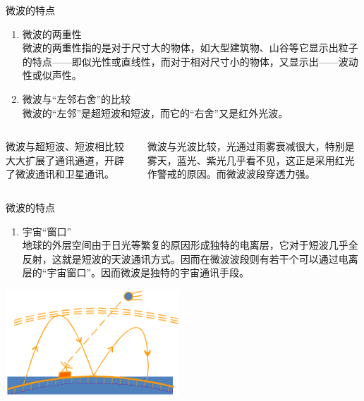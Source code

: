 \documentclass{beamer}
\newcounter{savedenum}
\newcommand*{\saveenum}{\setcounter{savedenum}{\theenumi}}
\newcommand*{\resume}{\setcounter{enumi}{\thesavedenum}}
\begin{document}
\begin{frame}{微波的特点}
  \begin{enumerate}
    \item 微波的两重性\\ 微波的两重性指的是对于尺寸大的物体，如大型建筑物、山谷等它显示出粒子的特点——即似光性或直线性，而对于相对尺寸小的物体，又显示出——波动性或似声性。
    \item 微波与“左邻右舍”的比较\\ 微波的“左邻”是超短波和短波，而它的“右舍”又是红外光波。
    \saveenum
  \end{enumerate}
  \begin{columns}
    \begin{column}{0.43\linewidth}
      \begin{tcolorbox}[colback=green!5,colframe=green!40!black,title=微波与超短波、短波比较]
        微波与超短波、短波相比较大大扩展了通讯通道，开辟了微波通讯和卫星通讯。
      \end{tcolorbox}
    \end{column}
    \begin{column}{0.55\linewidth}
      \begin{tcolorbox}[colback=blue!5,colframe=blue!40!black,title=微波与光波比较]
        微波与光波比较，光通过雨雾衰减很大，特别是雾天，蓝光、紫光几乎看不见，这正是采用红光作警戒的原因。而微波波段穿透力强。
      \end{tcolorbox}
    \end{column}
  \end{columns}
\end{frame}

\begin{frame}{微波的特点}
  \begin{enumerate}
    \resume
    \item 宇宙“窗口”\\地球的外层空间由于日光等繁复的原因形成独特的电离层，它对于短波几乎全反射，这就是短波的天波通讯方式。因而在微波波段则有若干个可以通过电离层的“宇宙窗口”。因而微波是独特的宇宙通讯手段。
    \saveenum
  \end{enumerate}
  \centering
  \includegraphics[width=6.5cm]{cosmicwindow.png}
\end{frame}
\end{document}
